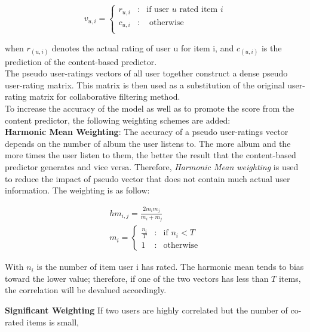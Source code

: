 \begin{displaymath}
v_{u,i} = \left\{ \begin{array}{lcl} r_{u,i} & \mbox{:} & \text{if user }u \text{ rated item } i \\
c_{u,i} & \mbox{:} & \text{ otherwise} \\
\end{array} \right.
\end{displaymath}

\noindent when \( r_{(u,i)} \) denotes the actual rating of user u for item i, and \(c_{(u,i)} \) is the prediction of the content-based predictor. \\

\noindent The pseudo user-ratings vectors of all user together construct a dense pseudo user-rating matrix. This matrix is then used as a substitution of the original user-rating matrix for collaborative filtering method. \\

\noindent To increase the accuracy of the model as well as to promote the score from the content predictor,
the following weighting schemes are added:\\

\noindent \textbf{Harmonic Mean Weighting}: The accuracy of a pseudo user-ratings vector depends on the number of album the user listens to. The more album and the more times the user listen to them, the better the result that the content-based predictor generates and vice versa. Therefore, \textit{Harmonic Mean weighting} is used to reduce the impact of pseudo vector that does not contain much actual user information. The weighting is as follow:

\begin{gather*}
hm_{i,j} = \frac{2m_im_j}{m_i + m_j} \\
m_i = \left\{ \begin{array}{lcl} 
\frac{n_i}{T} & \mbox{:} & \text{if } n_i < T \\
1 & \mbox{:} & \text{otherwise} 
\end{array}
\right.
\end{gather*} 

With \( n_i \) is the number of item user i has rated. The harmonic mean tends to bias toward the lower value; therefore, if one of the two vectors has less than \(T\) items, the correlation will be devalued accordingly. 


\noindent \textbf{Significant Weighting} If two users are highly correlated but the number of co-rated items is small, 

